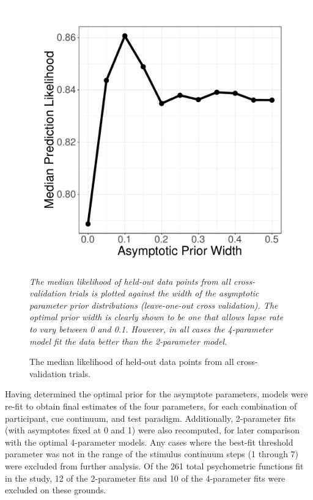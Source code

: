 \documentclass[../uwthesis.tex]{subfiles}
\begin{document}
\begin{figure}
    \centering
    \caption{The median likelihood of held-out data points from all cross-validation trials.}
    \label{fig:a}
    \includegraphics[width = 10 cm]{images/paper_1/figure_cross_validation.pdf}
    \item \textit{The median likelihood of held-out data points from all cross-validation trials is plotted against the width of the asymptotic parameter prior distributions (leave-one-out cross validation). The optimal prior width is clearly shown to be one that allows lapse rate to vary between 0 and 0.1. However, in all cases the 4-parameter model fit the data better than the 2-parameter model.}
\end{figure}


Having determined the optimal prior for the asymptote parameters, models were re-fit to obtain final estimates of the four parameters, for each combination of participant, cue continuum, and test paradigm. Additionally, 2-parameter fits (with asymptotes fixed at 0 and 1) were also recomputed, for later comparison with the optimal 4-parameter models. Any cases where the best-fit threshold parameter was not in the range of the stimulus continuum steps (1 through 7) were excluded from further analysis. Of the 261 total psychometric functions fit in the study, 12 of the 2-parameter fits and 10 of the 4-parameter fits were excluded on these grounds.
\end{document}
